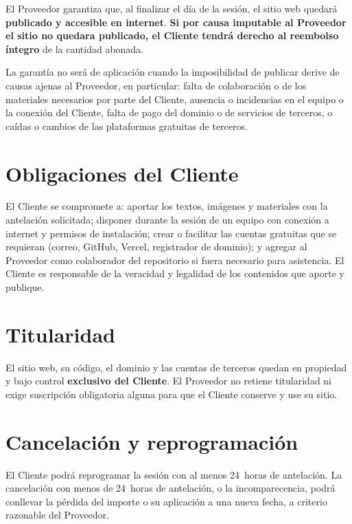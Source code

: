 \documentclass[11pt,a4paper]{article}
\begin{document}
El Proveedor garantiza que, al finalizar el día de la sesión, el sitio web quedará
\textbf{publicado y accesible en internet}. \textbf{Si por causa imputable al
Proveedor el sitio no quedara publicado, el Cliente tendrá derecho al reembolso
íntegro} de la cantidad abonada.

\smallskip
La garantía no será de aplicación cuando la imposibilidad de publicar derive de
causas ajenas al Proveedor, en particular: falta de colaboración o de los
materiales necesarios por parte del Cliente, ausencia o incidencias en el equipo o
la conexión del Cliente, falta de pago del dominio o de servicios de terceros, o
caídas o cambios de las plataformas gratuitas de terceros.

\section{Obligaciones del Cliente}

El Cliente se compromete a: aportar los textos, imágenes y materiales con la
antelación solicitada; disponer durante la sesión de un equipo con conexión a
internet y permisos de instalación; crear o facilitar las cuentas gratuitas que se
requieran (correo, GitHub, Vercel, registrador de dominio); y agregar al Proveedor
como colaborador del repositorio si fuera necesario para asistencia. El Cliente es
responsable de la veracidad y legalidad de los contenidos que aporte y publique.

\section{Titularidad}

El sitio web, su código, el dominio y las cuentas de terceros quedan en propiedad y
bajo control \textbf{exclusivo del Cliente}. El Proveedor no retiene titularidad ni
exige suscripción obligatoria alguna para que el Cliente conserve y use su sitio.

\section{Cancelación y reprogramación}

El Cliente podrá reprogramar la sesión con al menos 24~horas de antelación. La
cancelación con menos de 24~horas de antelación, o la incomparecencia, podrá
conllevar la pérdida del importe o su aplicación a una nueva fecha, a criterio
razonable del Proveedor.
\end{document}
